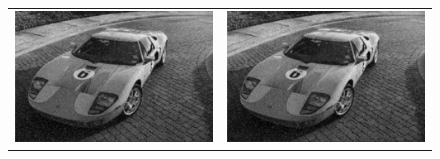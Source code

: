 \begin{landscape}
		\begin{figure}[!h]
			\begin{tabular}{cc}
				\includegraphics[width=12.25cm]{Imagenes/Ruido_sp_25_FMA_5.png} & \includegraphics[width=12.25cm]{Imagenes/Ruido_sp_25_Gauss_5_5.png} \\

\end{tabular}
\end{figure}
\end{landscape}
